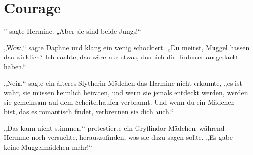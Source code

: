 \chapter{Courage}

” sagte Hermine. „Aber sie sind beide Jungs!“

\hplettrineextrapara
„Wow,“ sagte Daphne und klang ein wenig schockiert. „Du meinst, Muggel hassen das wirklich? Ich dachte, das wäre nur etwas, das sich die Todesser ausgedacht haben.“

„Nein,“ sagte ein älteres Slytherin-Mädchen das Hermine nicht erkannte, „es ist wahr, sie müssen heimlich heiraten, und wenn sie jemals entdeckt werden, werden sie gemeinsam auf dem Scheiterhaufen verbrannt. Und wenn du ein Mädchen bist, das es romantisch findet, verbrennen sie dich auch.“

„Das kann nicht stimmen,“ protestierte ein Gryffindor-Mädchen, während Hermine noch versuchte, herauszufinden, was sie dazu sagen sollte. „Es gäbe keine Muggelmädchen mehr!“

